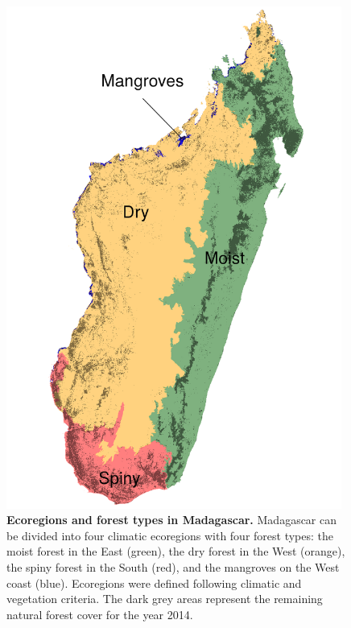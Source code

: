 \documentclass[a4paper, 12pt, leqno]{article} %
\begin{document}
\vfill
\begin{figure}[h!]
  \centering
    
    \includegraphics[width=11cm]{figs/ecoregion.png}

    \caption{\textbf{Ecoregions and forest types in Madagascar.}
      Madagascar can be divided into four climatic ecoregions with
      four forest types: the moist forest in the East (green), the dry
      forest in the West (orange), the spiny forest in the South
      (red), and the mangroves on the West coast (blue). Ecoregions
      were defined following climatic \citep{Cornet1974} and
      vegetation \citep{IEFN1996} criteria. The dark grey areas
      represent the remaining natural forest cover for the year 2014.}
   
    \label{fig:ecoregion}
    
\end{figure}
\vfill

\newpage
\end{document}
